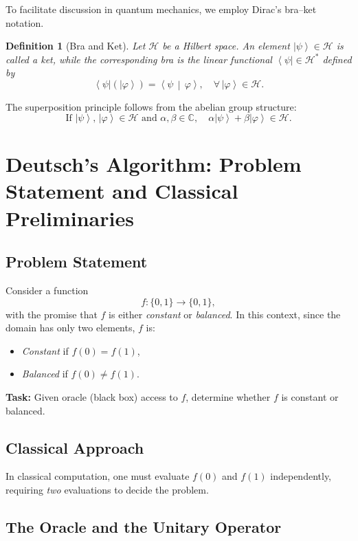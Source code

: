 \documentclass[11pt,oneside]{book}
\newtheorem{definition}{Definition}[chapter]
\theoremstyle{remark}
\renewcommand{\ket}[1]{\left|#1\right\rangle}
\renewcommand{\bra}[1]{\left\langle#1\right|}
\renewcommand{\braket}[2]{\left\langle#1\,\middle|\,#2\right\rangle}
\begin{document}
	To facilitate discussion in quantum mechanics, we employ Dirac's bra--ket notation.
	
	\begin{definition}[Bra and Ket]
		Let $\mathcal{H}$ be a Hilbert space. An element $\ket{\psi}\in\mathcal{H}$ is called a \emph{ket}, while the corresponding \emph{bra} is the linear functional $\bra{\psi}\in\mathcal{H}^*$ defined by
		\[
		\bra{\psi}(\ket{\varphi})=\braket{\psi}{\varphi},\quad \forall\,\ket{\varphi}\in\mathcal{H}.
		\]
	\end{definition}
	
	The superposition principle follows from the abelian group structure:
	\[
	\text{If } \ket{\psi},\,\ket{\varphi}\in\mathcal{H} \text{ and } \alpha,\beta\in\mathbb{C}, \quad \alpha\ket{\psi}+\beta\ket{\varphi}\in \mathcal{H}.
	\]
	
	\chapter{Deutsch's Algorithm: Problem Statement and Classical Preliminaries}
	
	\section{Problem Statement}
	
	Consider a function 
	\[
	f:\{0,1\}\to \{0,1\},
	\]
	with the promise that $f$ is either \emph{constant} or \emph{balanced}. In this context, since the domain has only two elements, $f$ is:
	\begin{itemize}
		\item \emph{Constant} if $f(0)=f(1)$,
		\item \emph{Balanced} if $f(0)\neq f(1)$.
	\end{itemize}
	
	\textbf{Task:} Given oracle (black box) access to $f$, determine whether $f$ is constant or balanced.
	
	\section{Classical Approach}
	
	In classical computation, one must evaluate $f(0)$ and $f(1)$ independently, requiring \emph{two} evaluations to decide the problem.
	
	\section{The Oracle and the Unitary Operator}
	
\end{document}
